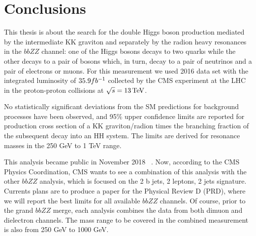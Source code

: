 \chapter{Conclusions}
\label{ch:Conclusions}


This thesis is about the search for the double Higgs boson production mediated by the intermediate KK graviton and separately by the radion heavy resonances in the $bbZZ$ channel: one of the Higgs bosons decays to
two \Pqb quarks while the other decays to a pair of \PZ bosons which, in
turn, decay to a pair of neutrinos and a pair of electrons or muons. For this measurement we used 2016 data set with the integrated luminosity of $35.9fb^{-1}$ collected by the CMS experiment at the LHC in the proton-proton collisions at $\sqrt{s} = 13 \,\text{Te\hspace{-.08em}V}$.

No statistically significant deviations from the SM predictions for
background processes have been observed, and 95\% upper confidence limits are reported for production cross section
of a KK graviton/radion times the branching fraction of the subsequent decay into an
HH system. The limits are derived for resonance masses in the 250 GeV to 1 TeV range.

This analysis became public in November 2018 ~\cite{CMS-PAS-HIG-17-032}. Now, according to the CMS Physics Coordination, CMS wants to see a combination of this analysis with the other $bbZZ$ analysis, which is focused on the 2 b jets, 2 leptons, 2 jets signature. 
Currents plans are to produce a paper for the Physical Review D (PRD), where we will report the best limits for all available $bbZZ$ channels. Of course, prior to the grand $bbZZ$ merge, each analysis combines the data from both dimuon and dielectron channels. The mass range to be covered in the combined measurement is also from 250 GeV to 1000 GeV.

 

